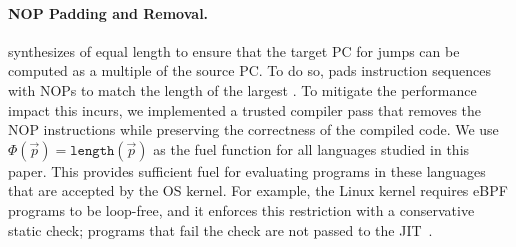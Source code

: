 \paragraph{NOP Padding and Removal.}
\jitsynth synthesizes \minicompilers of equal length to ensure that
the target PC for jumps can be computed as a multiple of the source PC.
%
To do so, \jitsynth pads instruction sequences with NOPs to match the length
of the largest \minicompiler.
%
To mitigate the performance impact this incurs, we implemented a trusted compiler
pass that removes the NOP instructions while preserving the correctness of
the compiled code.
\fi
%
We use $\Phi(\vec{p}) = \texttt{length}(\vec{p})$ as the fuel function for all
languages studied in this paper. This provides sufficient fuel for evaluating
programs in these languages that are accepted by the OS kernel. For example, the
Linux kernel requires eBPF programs to be loop-free, and it enforces this
restriction with a conservative static check; programs that fail the check are
not passed to the JIT~\cite{gershuni:crab-ebpf}.
\tighten
